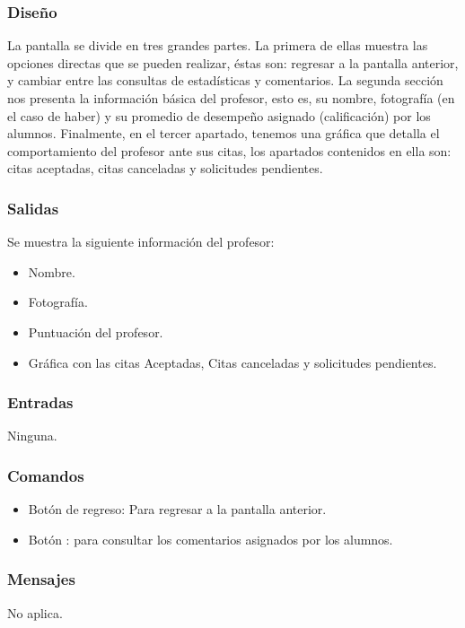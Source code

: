 \subsubsection{Diseño}
	\noindent
	La pantalla se divide en tres grandes partes. La primera de ellas muestra las opciones directas que se pueden realizar, éstas son: regresar a la pantalla anterior, y cambiar entre las consultas de estadísticas y comentarios. La segunda sección nos presenta la información básica del profesor, esto es, su nombre, fotografía (en el caso de haber) y su promedio de desempeño asignado (calificación) por los alumnos. Finalmente, en el tercer apartado, tenemos una gráfica que detalla el comportamiento del profesor ante sus citas, los apartados contenidos en ella son: citas aceptadas, citas canceladas y solicitudes pendientes. 

\pagebreak
{}

\subsubsection{Salidas}
	Se muestra la siguiente información del profesor:
	\begin{itemize} 
		\item Nombre.
		\item Fotografía.
		\item Puntuación del profesor.
		\item Gráfica con las citas Aceptadas, Citas canceladas y solicitudes pendientes.
	\end{itemize}

\subsubsection{Entradas}
	\noindent
	Ninguna.

\subsubsection{Comandos}
\begin{itemize}
	\item Botón de regreso: Para regresar a la pantalla anterior.
	\item Botón : para consultar los comentarios asignados por los alumnos.
\end{itemize}

\subsubsection{Mensajes}
	\noindent
	No aplica.

